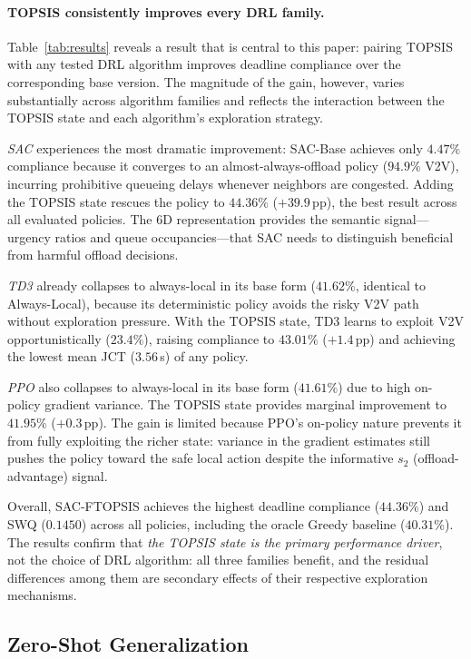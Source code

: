\documentclass[iicol]{sn-jnl}
\begin{document}
\paragraph{TOPSIS consistently improves every DRL family.}
Table~\ref{tab:results} reveals a result that is central to this paper:
pairing TOPSIS with any tested DRL algorithm improves deadline compliance
over the corresponding base version.
The magnitude of the gain, however, varies substantially across algorithm
families and reflects the interaction between the TOPSIS state and each
algorithm's exploration strategy.

\emph{SAC} experiences the most dramatic improvement:
SAC-Base achieves only $4.47\%$ compliance because it converges to an
almost-always-offload policy ($94.9\%$ V2V), incurring prohibitive queueing
delays whenever neighbors are congested.
Adding the TOPSIS state rescues the policy to $44.36\%$ ($\mathbf{+39.9}$\,pp),
the best result across all evaluated policies.
The 6D representation provides the semantic signal—urgency ratios and
queue occupancies—that SAC needs to distinguish beneficial from harmful offload
decisions.

\emph{TD3} already collapses to always-local in its base form ($41.62\%$,
identical to Always-Local), because its deterministic policy avoids the risky
V2V path without exploration pressure.
With the TOPSIS state, TD3 learns to exploit V2V opportunistically
($23.4\%$), raising compliance to $43.01\%$ ($+1.4$\,pp) and achieving
the lowest mean JCT ($3.56$\,s) of any policy.

\emph{PPO} also collapses to always-local in its base form ($41.61\%$) due
to high on-policy gradient variance.
The TOPSIS state provides marginal improvement to $41.95\%$ ($+0.3$\,pp).
The gain is limited because PPO's on-policy nature prevents it from fully
exploiting the richer state: variance in the gradient estimates still pushes
the policy toward the safe local action despite the informative $s_2$
(offload-advantage) signal.

Overall, SAC-FTOPSIS achieves the highest deadline compliance ($44.36\%$)
and SWQ ($0.1450$) across all policies, including the oracle Greedy baseline
($40.31\%$).
The results confirm that \emph{the TOPSIS state is the primary performance
driver}, not the choice of DRL algorithm: all three families benefit, and
the residual differences among them are secondary effects of their
respective exploration mechanisms.

\subsection{Zero-Shot Generalization}
\end{document}
